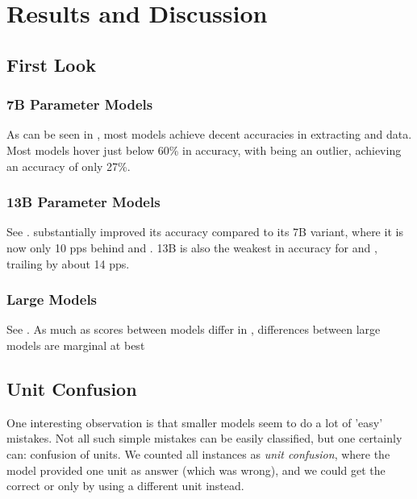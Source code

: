 \chapter{Results and Discussion}\label{chap:results}






\section{First Look}\label{sec:result:first}

\subsection{7B Parameter Models}\label{sub:result:7b}
As can be seen in , most models achieve decent accuracies in extracting \ttemp and \ttime data.
Most models hover just below 60\% in \tsolv accuracy, with  being an outlier, achieving an accuracy of only 27\%.

\subsection{13B Parameter Models}\label{sub:result:13b}
See . 
 substantially improved its \tsolv accuracy compared to its 7B variant, where it is now only 10 \glspl{pp} behind  and .
 13B is also the weakest in accuracy for \ttemp and \ttime, trailing by about 14 \glspl{pp}.

\subsection{Large Models}\label{sub:result:large}
See . As much as scores between models differ in , differences between large models are marginal at best

\section{Unit Confusion}\label{sec:unitconfusion}


One interesting observation is that smaller models seem to do a lot of 'easy' mistakes.
Not all such simple mistakes can be easily classified, but one certainly can: confusion of units.
We counted all instances as \textit{unit confusion}, where the model provided one unit as answer (which was wrong), and we could get the correct \ttemp or \ttime only by using a different unit instead.

